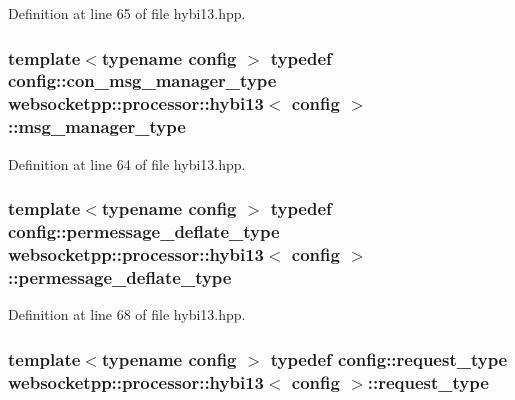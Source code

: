 Definition at line 65 of file hybi13.\+hpp.

\hypertarget{classwebsocketpp_1_1processor_1_1hybi13_a25a9c3d7a121ae54e064f47a6a7a5931}{}
\subsubsection[{msg\+\_\+manager\+\_\+type}]{\setlength{\rightskip}{0pt plus 5cm}template$<$typename config $>$ typedef config\+::con\+\_\+msg\+\_\+manager\+\_\+type {\bf websocketpp\+::processor\+::hybi13}$<$ config $>$\+::{\bf msg\+\_\+manager\+\_\+type}}\label{classwebsocketpp_1_1processor_1_1hybi13_a25a9c3d7a121ae54e064f47a6a7a5931}


Definition at line 64 of file hybi13.\+hpp.

\hypertarget{classwebsocketpp_1_1processor_1_1hybi13_a9e82fb49b851fa427f409aab42d7b6a9}{}
\subsubsection[{permessage\+\_\+deflate\+\_\+type}]{\setlength{\rightskip}{0pt plus 5cm}template$<$typename config $>$ typedef config\+::permessage\+\_\+deflate\+\_\+type {\bf websocketpp\+::processor\+::hybi13}$<$ config $>$\+::{\bf permessage\+\_\+deflate\+\_\+type}}\label{classwebsocketpp_1_1processor_1_1hybi13_a9e82fb49b851fa427f409aab42d7b6a9}


Definition at line 68 of file hybi13.\+hpp.

\hypertarget{classwebsocketpp_1_1processor_1_1hybi13_aaf7438e06dfb60da29ef201f8c8cf2dd}{}
\subsubsection[{request\+\_\+type}]{\setlength{\rightskip}{0pt plus 5cm}template$<$typename config $>$ typedef config\+::request\+\_\+type {\bf websocketpp\+::processor\+::hybi13}$<$ config $>$\+::{\bf request\+\_\+type}}\label{classwebsocketpp_1_1processor_1_1hybi13_aaf7438e06dfb60da29ef201f8c8cf2dd}


